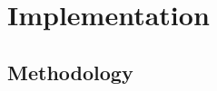 \chapter{Implementation}
\label{chap:implementation}
\vspace{0.5cm}


\section{Methodology}
\label{sec:metodology}
